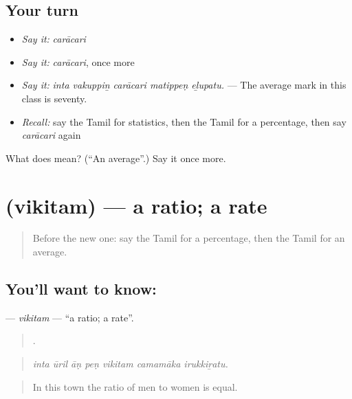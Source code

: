 \subsection*{Your turn}
\begin{itemize}
\raggedright
  \item \emph{Say it:} \emph{carācari}
  \item \emph{Say it:} \emph{carācari}, once more
  \item \emph{Say it:} \emph{inta vakuppiṉ carācari matippeṇ eḻupatu.} — The average mark in this class is seventy.
  \item \emph{Recall:} say the Tamil for statistics, then the Tamil for a percentage, then say \emph{carācari} again
\end{itemize}

\begin{tcolorbox}[breakable,colback=teal!4,colframe=teal!35!black,title={Before you move on}]
What does  mean? (\textquotedblleft{}An average\textquotedblright{}.) Say it once more.
\end{tcolorbox}
\section[\texorpdfstring{\ta{விகிதம்} (vikitam)}{விகிதம் (vikitam)}]{ (vikitam) — a ratio; a rate}

\label{lesson:TA-C363-vikitam}



\begin{quote}
Before the new one: say the Tamil for a percentage, then the Tamil for an average.
\end{quote}

\subsection*{You'll want to know: }
\textbf{} — \emph{vikitam} — \textquotedblleft{}a ratio; a rate\textquotedblright{}.

\begin{quote}
      .
\end{quote}

\begin{quote}
\emph{inta ūril āṇ peṇ vikitam camamāka irukkiṟatu.}
\end{quote}

\begin{quote}
In this town the ratio of men to women is equal.
\end{quote}

